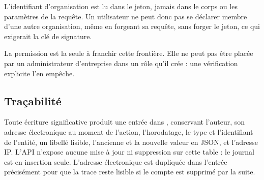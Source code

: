 L'identifiant d'organisation est lu dans le jeton, jamais dans le corps ou les
paramètres de la requête. Un utilisateur ne peut donc pas se déclarer membre d'une autre
organisation, même en forgeant sa requête, sans forger le jeton, ce qui exigerait la clé
de signature.

La permission  est la seule à franchir cette frontière. Elle ne
peut pas être placée par un administrateur d'entreprise dans un rôle qu'il crée : une
vérification explicite l'en empêche.

\subsection{Traçabilité}

Toute écriture significative produit une entrée dans , conservant
l'auteur, son adresse électronique au moment de l'action, l'horodatage, le type et
l'identifiant de l'entité, un libellé lisible, l'ancienne et la nouvelle valeur en JSON,
et l'adresse IP. L'API n'expose aucune mise à jour ni suppression sur cette table : le
journal est en insertion seule. L'adresse électronique est dupliquée dans l'entrée
précisément pour que la trace reste lisible si le compte est supprimé par la suite.
